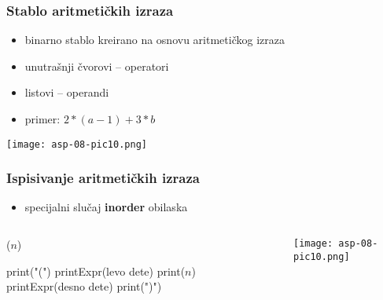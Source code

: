 \documentclass[compress]{beamer}
\begin{document}
\begin{frame}[fragile]
  \frametitle{Stablo aritmetičkih izraza}
  \begin{itemize}
    \item binarno stablo kreirano na osnovu aritmetičkog izraza
    \item unutrašnji čvorovi -- operatori
    \item listovi -- operandi
    \item primer: $2 * (a - 1) + 3 * b$
  \end{itemize}
  \begin{center}
    \texttt{[image: asp-08-pic10.png]}
  \end{center}
\end{frame}

\begin{frame}[fragile]
  \frametitle{Ispisivanje aritmetičkih izraza}
  \begin{itemize}
    \item specijalni slučaj \textbf{inorder} obilaska
  \end{itemize}
\begin{columns}
  \begin{column}[c]{5cm}
    ($n$)
    \begin{algorithmic}
      \STATE print("(")
      \STATE printExpr(levo dete)
    \ENDIF
    \STATE print($n$)
      \STATE printExpr(desno dete)
      \STATE print(")")
    \ENDIF
    \end{algorithmic}
  \end{column}
  \begin{column}[c]{6cm}
    \begin{center}
      \texttt{[image: asp-08-pic10.png]}
    \end{center}
  \end{column}
\end{columns}
\end{frame}
\end{document}
